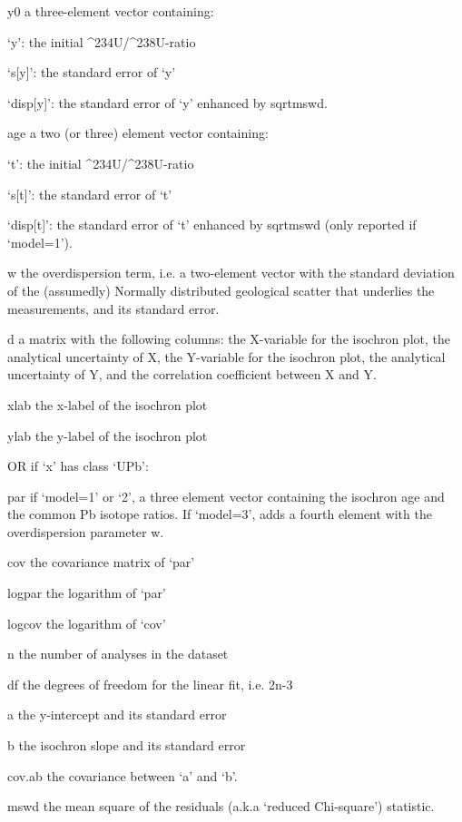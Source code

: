     y0 a three-element vector containing:

          ‘y’: the initial ^{234}U/^{238}U-ratio

          ‘s[y]’: the standard error of ‘y’

          ‘disp[y]’: the standard error of ‘y’ enhanced by sqrt{mswd}.

     age a two (or three) element vector containing:

          ‘t’: the initial ^{234}U/^{238}U-ratio

          ‘s[t]’: the standard error of ‘t’

          ‘disp[t]’: the standard error of ‘t’ enhanced by sqrt{mswd}
          (only reported if ‘model=1’).

     w the overdispersion term, i.e. a two-element vector with the
          standard deviation of the (assumedly) Normally distributed
          geological scatter that underlies the measurements, and its
          standard error.

     d a matrix with the following columns: the X-variable for the
          isochron plot, the analytical uncertainty of X, the
          Y-variable for the isochron plot, the analytical uncertainty
          of Y, and the correlation coefficient between X and Y.

     xlab the x-label of the isochron plot

     ylab the y-label of the isochron plot

     OR if ‘x’ has class ‘UPb’:

     par if ‘model=1’ or ‘2’, a three element vector containing the
          isochron age and the common Pb isotope ratios. If ‘model=3’,
          adds a fourth element with the overdispersion parameter w.

     cov the covariance matrix of ‘par’

     logpar the logarithm of ‘par’

     logcov the logarithm of ‘cov’

     n the number of analyses in the dataset

     df the degrees of freedom for the linear fit, i.e. 2n-3

     a the y-intercept and its standard error

     b the isochron slope and its standard error

     cov.ab the covariance between ‘a’ and ‘b’.

     mswd the mean square of the residuals (a.k.a `reduced Chi-square')
          statistic.

